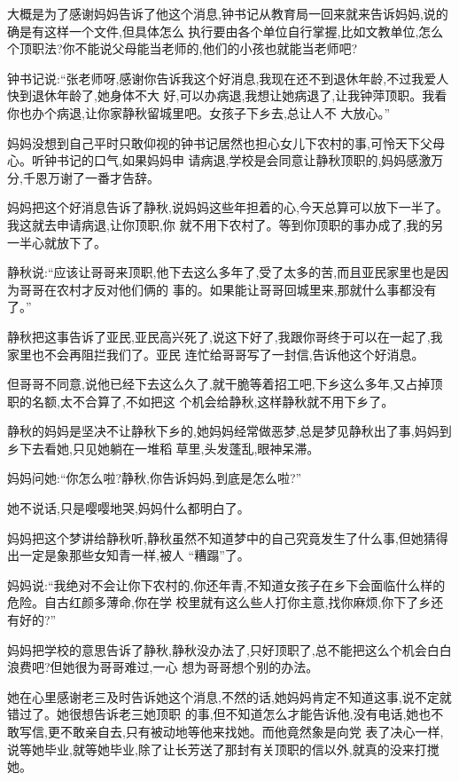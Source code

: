 ﻿\documentclass[12pt]{article}
\begin{document}
大概是为了感谢妈妈告诉了他这个消息,钟书记从教育局一回来就来告诉妈妈,说的确是有这样一个文件,但具体怎么
执行要由各个单位自行掌握,比如文教单位,怎么个顶职法?你不能说父母能当老师的,他们的小孩也就能当老师吧?

钟书记说:``张老师呀,感谢你告诉我这个好消息,我现在还不到退休年龄,不过我爱人快到退休年龄了,她身体不大
好,可以办病退,我想让她病退了,让我钟萍顶职。我看你也办个病退,让你家静秋留城里吧。女孩子下乡去,总让人不
大放心。''

妈妈没想到自己平时只敢仰视的钟书记居然也担心女儿下农村的事,可怜天下父母心。听钟书记的口气,如果妈妈申
请病退,学校是会同意让静秋顶职的,妈妈感激万分,千恩万谢了一番才告辞。

妈妈把这个好消息告诉了静秋,说妈妈这些年担着的心,今天总算可以放下一半了。我这就去申请病退,让你顶职,你
就不用下农村了。等到你顶职的事办成了,我的另一半心就放下了。

静秋说:``应该让哥哥来顶职,他下去这么多年了,受了太多的苦,而且亚民家里也是因为哥哥在农村才反对他们俩的
事的。如果能让哥哥回城里来,那就什么事都没有了。''

静秋把这事告诉了亚民,亚民高兴死了,说这下好了,我跟你哥终于可以在一起了,我家里也不会再阻拦我们了。亚民
连忙给哥哥写了一封信,告诉他这个好消息。

但哥哥不同意,说他已经下去这么久了,就干脆等着招工吧,下乡这么多年,又占掉顶职的名额,太不合算了,不如把这
个机会给静秋,这样静秋就不用下乡了。

静秋的妈妈是坚决不让静秋下乡的,她妈妈经常做恶梦,总是梦见静秋出了事,妈妈到乡下去看她,只见她躺在一堆稻
草里,头发蓬乱,眼神呆滞。

妈妈问她:``你怎么啦?静秋,你告诉妈妈,到底是怎么啦?''

她不说话,只是嘤嘤地哭,妈妈什么都明白了。

妈妈把这个梦讲给静秋听,静秋虽然不知道梦中的自己究竟发生了什么事,但她猜得出一定是象那些女知青一样,被人
``糟蹋''了。

妈妈说:``我绝对不会让你下农村的,你还年青,不知道女孩子在乡下会面临什么样的危险。自古红颜多薄命,你在学
校里就有这么些人打你主意,找你麻烦,你下了乡还有好的?''

妈妈把学校的意思告诉了静秋,静秋没办法了,只好顶职了,总不能把这么个机会白白浪费吧?但她很为哥哥难过,一心
想为哥哥想个别的办法。

她在心里感谢老三及时告诉她这个消息,不然的话,她妈妈肯定不知道这事,说不定就错过了。她很想告诉老三她顶职
的事,但不知道怎么才能告诉他,没有电话,她也不敢写信,更不敢亲自去,只有被动地等他来找她。而他竟然象是向党
表了决心一样,说等她毕业,就等她毕业,除了让长芳送了那封有关顶职的信以外,就真的没来打搅她。
\end{document}
